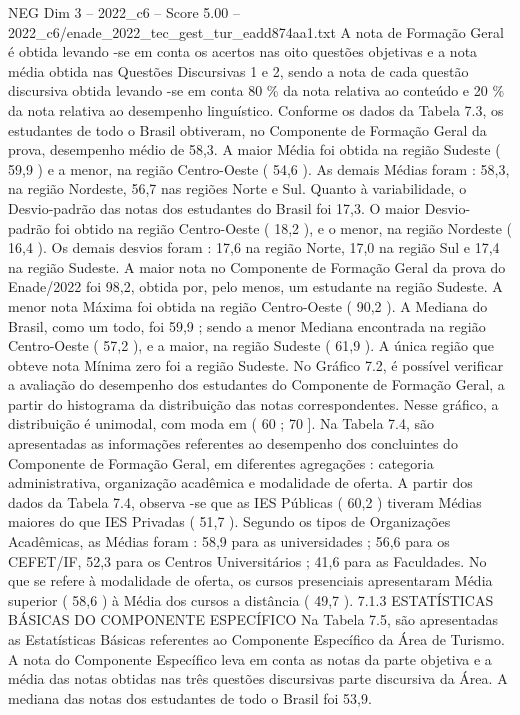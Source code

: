 \begin{textsample}{NEG Dim 3 – 2022\_c6 – Score 5.00 – 2022\_c6/enade\_2022\_tec\_gest\_tur\_eadd874aa1.txt}
A nota de Formação Geral é obtida levando -se em conta os acertos nas oito questões objetivas e a nota média obtida nas Questões Discursivas 1 e 2, sendo a nota de cada questão discursiva obtida levando -se em conta 80 \% da nota relativa ao conteúdo e 20 \% da nota relativa ao desempenho linguístico.
Conforme os dados da Tabela 7.3, os estudantes de todo o Brasil obtiveram, no Componente de Formação Geral da prova, desempenho médio de 58,3.
A maior Média foi obtida na região Sudeste ( 59,9 ) e a menor, na região Centro-Oeste ( 54,6 ).
As demais Médias foram : 58,3, na região Nordeste, 56,7 nas regiões Norte e Sul.
Quanto à variabilidade, o Desvio-padrão das notas dos estudantes do Brasil foi 17,3.
O maior Desvio-padrão foi obtido na região Centro-Oeste ( 18,2 ), e o menor, na região Nordeste ( 16,4 ).
Os demais desvios foram : 17,6 na região Norte, 17,0 na região Sul e 17,4 na região Sudeste.
A maior nota no Componente de Formação Geral da prova do Enade/2022 foi 98,2, obtida por, pelo menos, um estudante na região Sudeste.
A menor nota Máxima foi obtida na região Centro-Oeste ( 90,2 ).
A Mediana do Brasil, como um todo, foi 59,9 ; sendo a menor Mediana encontrada na região Centro-Oeste ( 57,2 ), e a maior, na região Sudeste ( 61,9 ).
A única região que obteve nota Mínima zero foi a região Sudeste.
No Gráfico 7.2, é possível verificar a avaliação do desempenho dos estudantes do Componente de Formação Geral, a partir do histograma da distribuição das notas correspondentes.
Nesse gráfico, a distribuição é unimodal, com moda em ( 60 ; 70 ].
Na Tabela 7.4, são apresentadas as informações referentes ao desempenho dos concluintes do Componente de Formação Geral, em diferentes agregações : categoria administrativa, organização acadêmica e modalidade de oferta.
A partir dos dados da Tabela 7.4, observa -se que as IES Públicas ( 60,2 ) tiveram Médias maiores do que IES Privadas ( 51,7 ).
Segundo os tipos de Organizações Acadêmicas, as Médias foram : 58,9 para as universidades ; 56,6 para os CEFET/IF, 52,3 para os Centros Universitários ; 41,6 para as Faculdades.
No que se refere à modalidade de oferta, os cursos presenciais apresentaram Média superior ( 58,6 ) à Média dos cursos a distância ( 49,7 ). 7.1.3 ESTATÍSTICAS BÁSICAS DO COMPONENTE ESPECÍFICO Na Tabela 7.5, são apresentadas as Estatísticas Básicas referentes ao Componente Específico da Área de Turismo.
A nota do Componente Específico leva em conta as notas da parte objetiva e a média das notas obtidas nas três questões discursivas parte discursiva da Área.
A mediana das notas dos estudantes de todo o Brasil foi 53,9.

\end{textsample}
